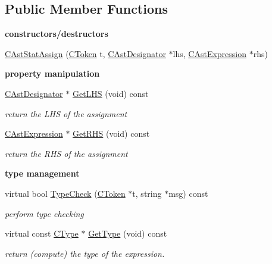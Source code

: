 \subsection*{Public Member Functions}
\begin{Indent}{\bf constructors/destructors}\par
\begin{DoxyCompactItemize}
\item 
\hyperlink{classCAstStatAssign_ae3cc66f1b3bd5437da8d2befb2bba83b}{C\-Ast\-Stat\-Assign} (\hyperlink{classCToken}{C\-Token} t, \hyperlink{classCAstDesignator}{C\-Ast\-Designator} $\ast$lhs, \hyperlink{classCAstExpression}{C\-Ast\-Expression} $\ast$rhs)
\end{DoxyCompactItemize}
\end{Indent}
\begin{Indent}{\bf property manipulation}\par
\begin{DoxyCompactItemize}
\item 
\hyperlink{classCAstDesignator}{C\-Ast\-Designator} $\ast$ \hyperlink{classCAstStatAssign_ab3fc288cea8e516893d109663d70df7e}{Get\-L\-H\-S} (void) const 
\begin{DoxyCompactList}\small\item\em return the L\-H\-S of the assignment \end{DoxyCompactList}\item 
\hyperlink{classCAstExpression}{C\-Ast\-Expression} $\ast$ \hyperlink{classCAstStatAssign_a95d26666a9473c4fdb13a3ce8ce1d0f5}{Get\-R\-H\-S} (void) const 
\begin{DoxyCompactList}\small\item\em return the R\-H\-S of the assignment \end{DoxyCompactList}\end{DoxyCompactItemize}
\end{Indent}
\begin{Indent}{\bf type management}\par
\begin{DoxyCompactItemize}
\item 
virtual bool \hyperlink{classCAstStatAssign_a4494a00f97f5bdbfb40b46769570d6c1}{Type\-Check} (\hyperlink{classCToken}{C\-Token} $\ast$t, string $\ast$msg) const 
\begin{DoxyCompactList}\small\item\em perform type checking \end{DoxyCompactList}\item 
\hypertarget{classCAstStatAssign_af1e1abd9a1f628aa7be1d1b46ad5fad3}{virtual const \hyperlink{classCType}{C\-Type} $\ast$ \hyperlink{classCAstStatAssign_af1e1abd9a1f628aa7be1d1b46ad5fad3}{Get\-Type} (void) const }\label{classCAstStatAssign_af1e1abd9a1f628aa7be1d1b46ad5fad3}

\begin{DoxyCompactList}\small\item\em return (compute) the type of the expression. \end{DoxyCompactList}\end{DoxyCompactItemize}
\end{Indent}
